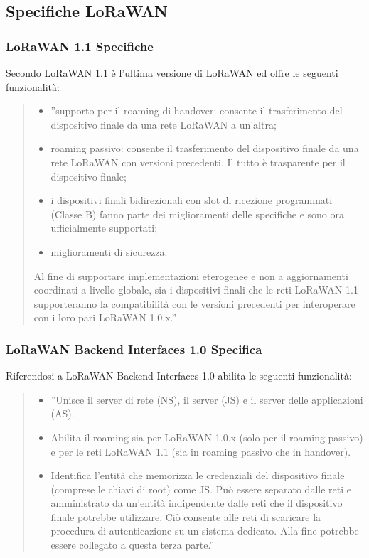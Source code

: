 \documentclass[a4paper]{report} %
\begin{document}
\subsection{Specifiche LoRaWAN}
\subsubsection{LoRaWAN 1.1 Specifiche}
Secondo \cite{art:rif.29} LoRaWAN 1.1 è l'ultima versione di LoRaWAN ed offre le seguenti funzionalità:
\begin{quote}
	\begin{itemize}
		\item ''supporto per il roaming di handover: consente il trasferimento del dispositivo finale da una rete LoRaWAN a un'altra; 
		\item roaming passivo: consente il trasferimento del dispositivo finale da una rete LoRaWAN con versioni precedenti. Il tutto è trasparente per il dispositivo finale;
		\item i dispositivi finali bidirezionali con slot di ricezione programmati (Classe B) fanno parte dei miglioramenti delle specifiche e sono ora ufficialmente supportati;
		\item miglioramenti di sicurezza.
	\end{itemize}
	Al fine di supportare implementazioni eterogenee e non a aggiornamenti coordinati a livello globale, sia i dispositivi finali che le reti LoRaWAN 1.1 supporteranno la compatibilità con le versioni precedenti per interoperare con i loro pari LoRaWAN 1.0.x.''
\end{quote}

\subsubsection{LoRaWAN Backend Interfaces 1.0 Specifica}
Riferendosi a \cite{art:rif.29} LoRaWAN Backend Interfaces 1.0 abilita le seguenti funzionalità:
\begin{quote}
	\begin{itemize}
	\item ''Unisce il server di rete (NS), il server (JS) e il server delle applicazioni (AS).
	\item Abilita il roaming sia per LoRaWAN 1.0.x (solo per il roaming passivo) e per le reti LoRaWAN 1.1 (sia in roaming passivo che in handover).
	\item Identifica l'entità che memorizza le credenziali del dispositivo finale (comprese le chiavi di root) come JS. Può essere separato dalle reti e amministrato da un'entità indipendente dalle reti che il dispositivo finale potrebbe utilizzare. Ciò consente alle reti di scaricare la procedura di autenticazione su un sistema dedicato. Alla fine potrebbe essere collegato a questa terza parte.''
	\end{itemize}
\end{quote}
\end{document}
